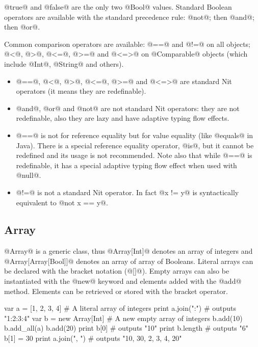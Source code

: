 @true@ and @false@ are the only two @Bool@ values.
Standard Boolean operators are available with the standard precedence rule: @not@; then @and@; then @or@.

Common comparison operators are available: @==@ and @!=@ on all objects; @<@, @>@, @<=@, @>=@ and @<=>@ on @Comparable@ objects (which include @Int@, @String@ and others). 

\begin{itemize}
\item @==@, @<@, @>@, @<=@, @>=@ and @<=>@ are standard Nit operators (it means they are redefinable).
\item @and@, @or@ and @not@ are not standard Nit operators: they are not redefinable, also they are lazy and have adaptive typing flow effects.
\item @==@ is not for reference equality but for value equality (like @equals@ in Java).
There is a special reference equality operator, @is@, but it cannot be redefined and its usage is not recommended.
Note also that while @==@ is redefinable, it has a special adaptive typing flow effect when used with @null@.
\item @!=@ is not a standard Nit operator. In fact @x != y@ is syntactically equivalent to @not x == y@.
\end{itemize}

\subsection{Array}\label{Array}

@Array@ is a generic class, thus @Array[Int]@ denotes an array of integers and @Array[Array[Bool]]@ denotes an array of array of Booleans.
Literal arrays can be declared with the bracket notation (@[]@).
Empty arrays can also be instantiated with the @new@ keyword and elements added with the @add@ method.
Elements can be retrieved or stored with the bracket operator.

\begin{lst}
var a = [1, 2, 3, 4] # A literal array of integers
print a.join(":") # outputs "1:2:3:4"
var b = new Array[Int] # A new empty array of integers
b.add(10)
b.add_all(a)
b.add(20)
print b[0] # outputs "10"
print b.length # outputs "6"
b[1] = 30
print a.join(", ") # outputs "10, 30, 2, 3, 4, 20"
\end{lst}

